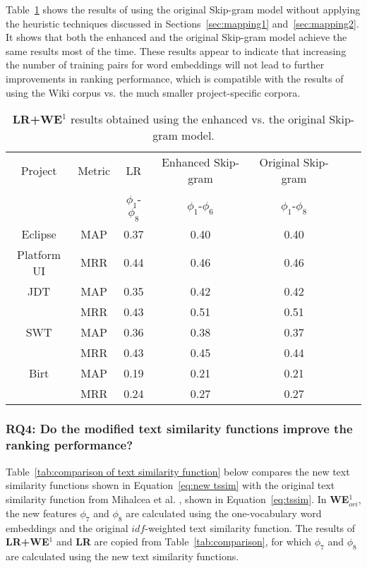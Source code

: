 Table~\ref{tab:comparison of skip-gram} shows the results of using the original Skip-gram model without applying the heuristic techniques discussed in Sections~\ref{sec:mapping1} and~\ref{sec:mapping2}. It shows that both the enhanced and the original Skip-gram model achieve the same results most of the time. These results appear to indicate that increasing the number of training pairs for word embeddings will not lead to further improvements in ranking performance, which is compatible with the results of using the Wiki corpus vs. the much smaller project-specific corpora.
\begin{table}[t]
\centering
\caption{\textbf{LR+WE$^1$} results obtained using the enhanced vs. the original Skip-gram model.}
\begin{adjustbox}{width=0.47\textwidth}
\begin{tabular}{|c|c|c|c|c|c|c|} \hline
Project & Metric & LR & Enhanced Skip-gram & Original Skip-gram\\
& & $\phi_1$-$\phi_8$ & $\phi_1$-$\phi_6$ & $\phi_1$-$\phi_8$ \\ \hline
Eclipse & MAP & 0.37 & 0.40 & 0.40 \\
Platform UI& MRR & 0.44 & 0.46 & 0.46 \\ \hline
JDT& MAP & 0.35 & 0.42 & 0.42 \\
& MRR & 0.43 & 0.51 & 0.51 \\ \hline
SWT& MAP & 0.36 & 0.38 & 0.37 \\
& MRR & 0.43 & 0.45 & 0.44 \\ \hline
Birt& MAP & 0.19 & 0.21 & 0.21 \\
& MRR & 0.24 & 0.27 & 0.27 \\ \hline
\end{tabular}
\end{adjustbox}
\label{tab:comparison of skip-gram}
\end{table}

\subsubsection{\textbf{RQ4:} Do the modified text similarity functions improve the ranking performance?}
\label{sec:evaluation:rq5}

Table~\ref{tab:comparison of text similarity function} below compares the new text similarity functions shown in Equation~\ref{eq:new tssim} with the original text similarity function from Mihalcea et al. \cite{mihalcea:aaai06}, shown in Equation~\ref{eq:tssim}. In \textbf{WE$^1_{ori}$}, the new features $\phi_7$ and $\phi_8$ are calculated using the one-vocabulary word embeddings and the original $idf$-weighted text similarity function. The results of \textbf{LR+WE$^1$} and \textbf{LR} are copied from Table~\ref{tab:comparison}, for which $\phi_7$ and $\phi_8$ are calculated using the new text similarity functions.

